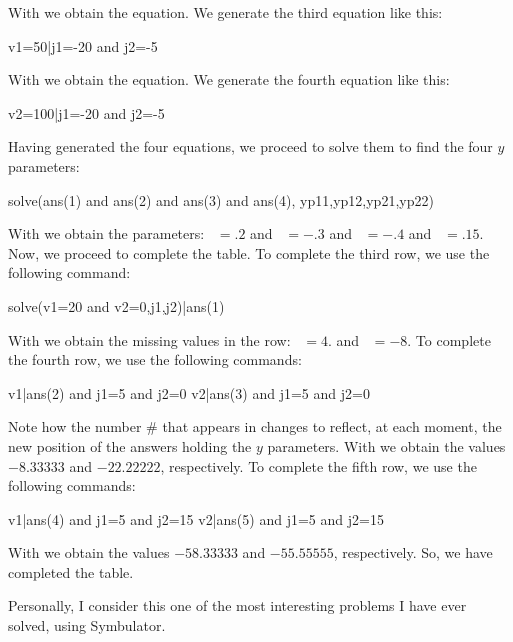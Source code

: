 With  we obtain the equation. We generate the third
equation like this:

\begin{entry}
v1=50|j1=-20 and j2=-5
\end{entry}

With  we obtain the equation. We generate the fourth
equation like this:

\begin{entry}
v2=100|j1=-20 and j2=-5
\end{entry}

Having generated the four equations, we proceed to solve them to
find the four $y$ parameters:

\begin{entry}
solve(ans(1) and ans(2) and ans(3) and ans(4),
      {yp11,yp12,yp21,yp22})
\end{entry}

With  we obtain the parameters: ~$= .2$ and
~$= -.3$ and ~$= -.4$ and
~$= .15$. Now, we proceed to complete the table. To
complete the third row, we use the following command:

\begin{entry}
solve(v1=20 and v2=0,{j1,j2})|ans(1)
\end{entry}

With  we obtain the missing values in the row:
~$= 4.$ and ~$= -8.$ To complete the fourth row,
we use the following commands:

\begin{entry}
v1|ans(2) and j1=5 and j2=0
v2|ans(3) and j1=5 and j2=0
\end{entry}

Note how the number \# that appears in  changes to
reflect, at each moment, the new position of the answers holding the
$y$ parameters. With  we obtain the values $-8.33333$ and
$-22.22222$, respectively. To complete the fifth row, we use the
following commands:

\begin{entry}
v1|ans(4) and j1=5 and j2=15
v2|ans(5) and j1=5 and j2=15
\end{entry}

With  we obtain the values $-58.33333$ and $-55.55555$,
respectively. So, we have completed the table.

Personally, I consider this one of the most interesting problems I
have ever solved, using Symbulator.


